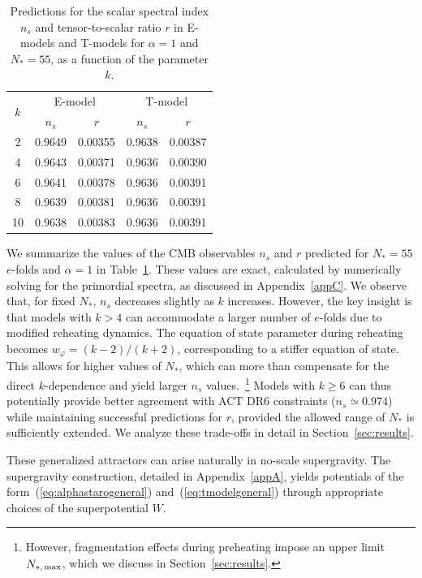 \documentclass[aps,prev,twocolumn,preprintnumbers,floatfix,nofootinbib]{revtex4-1}
\begin{document}
\begin{table}[ht!]
\centering
\setlength{\tabcolsep}{10pt}
\renewcommand{\arraystretch}{1.2}
\begin{tabular}{c|cc|cc}
\hline
\multirow{2}{*}{$k$} & \multicolumn{2}{c|}{E-model} & \multicolumn{2}{c}{T-model} \\
                     & $n_s$        & $r$           & $n_s$        & $r$          \\
\hline
2 & 0.9649 & 0.00355 & 0.9638 & 0.00387\\
4  & 0.9643 & 0.00371 & 0.9636 & 0.00390 \\
6  & 0.9641 & 0.00378 & 0.9636 & 0.00391 \\
8  & 0.9639 & 0.00381 & 0.9636 & 0.00391 \\
10 & 0.9638 & 0.00383 & 0.9636 & 0.00391 \\
\hline
\end{tabular}
\caption{Predictions for the scalar spectral index $n_s$ and tensor-to-scalar ratio $r$ in E-models and T-models for $\alpha = 1$ and $N_* = 55$, as a function of the parameter $k$. }
\label{tab:EvsTmodels}
\end{table}

We summarize the values of the CMB observables $n_s$ and $r$ predicted for $N_* = 55$ $e$-folds and $\alpha = 1$ in Table~\ref{tab:EvsTmodels}. These values are exact, calculated by numerically solving for the primordial spectra, as discussed in Appendix~\ref{appC}. We observe that, for fixed $N_*$, $n_s$ decreases slightly as $k$ increases. However, the key insight is that models with $k > 4$ can accommodate a larger number of $e$-folds due to modified reheating dynamics. The equation of state parameter during reheating becomes $w_{\varphi} = (k-2)/(k+2)$, corresponding to a stiffer equation of state. This allows for higher values of $N_*$, which can more than compensate for the direct $k$-dependence and yield larger $n_s$ values.~\footnote{However, fragmentation effects during preheating impose an upper limit $N_{*, \, \rm{max}}$, which we discuss in Section~\ref{sec:results}.} Models with $k \geq 6$ can thus potentially provide better agreement with ACT DR6 constraints ($n_s \simeq 0.974$) while maintaining successful predictions for $r$, provided the allowed range of $N_*$ is sufficiently extended. We analyze these trade-offs in detail in Section~\ref{sec:results}.

These generalized attractors can arise naturally in no-scale supergravity.  The supergravity construction, detailed in Appendix~\ref{appA}, yields potentials of the form~(\ref{eq:alphastarogeneral}) and~(\ref{eq:tmodelgeneral}) through appropriate choices of the superpotential $W$.
\end{document}
